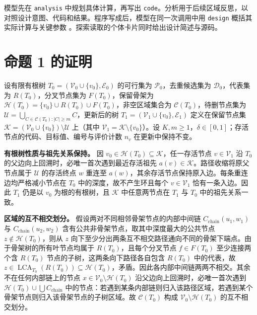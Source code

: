 \documentclass{article}
\begin{document}
模型先在 \texttt{analysis} 中规划具体计算，再写出 \texttt{code}。分析用于后续区域反思，以对照设计意图、代码和结果。程序写成后，模型在同一次调用中用 \texttt{design} 概括其实际计算与关键参数 \citep{mctsahd}。探索读取的个体卡片同时给出设计简述与源码。

\section{命题 1 的证明}\label{ux547dux9898-1-ux7684ux8bc1ux660e}

设有限有根树 \(T_0=(\mathcal V_0\cup\{v_0\},\mathcal E_0)\) 的可行集为 \(\mathcal P_0\)，去重候选集为 \(\mathcal D_0\)，代表集为 \(R(T_0)\)，分叉节点集为 \(F(T_0)\)，保留骨架为 \(\mathcal H(T_0)=\{v_0\}\cup R(T_0)\cup F(T_0)\)，非空区域集合为 \(\mathcal C(T_0)\)，待删节点集为 \(\mathcal U=\bigcup_{C\in\mathcal C(T_0):|C|\geq m}C\)，更新后的树 \(T_1=(\mathcal V_1\cup\{v_0\},\mathcal E_1)\) 定义在保留节点集 \(\mathcal K=(\mathcal V_0\cup\{v_0\})\setminus\mathcal U\) 上（其中 \(\mathcal V_1=\mathcal K\setminus\{v_0\}\)）。设 \(K,m\geq 1\)，\(\delta\in[0,1]\)；存活节点的代码、目标值、编号与评价计数 \(n_v\) 在更新中保持不变。

\textbf{有根树性质与祖先关系保持。} 因 \(v_0\in\mathcal H(T_0)\subseteq\mathcal K\)，任一存活节点 \(v\in\mathcal V_1\) 沿 \(T_0\) 的父边向上回溯时，必唯一首次遇到最近存活祖先 \(a(v)\in\mathcal K\)。路径收缩将原父节点属于 \(\mathcal U\) 的存活终点 \(w\) 重连至 \(a(w)\)，其余存活节点保持原入边。每条重连边均严格减小节点在 \(T_0\) 中的深度，故不产生环且每个 \(v\in\mathcal V_1\) 恰有一条入边。因此 \(T_1\) 仍是以 \(v_0\) 为根的有根树，且 \(\mathcal K\) 中任意两节点在 \(T_1\) 与 \(T_0\) 中的祖先关系一致。

\textbf{区域的互不相交划分。} 假设两对不同相邻骨架节点的内部中间链 \(C_{\text{chain}}(u_1,w_1)\) 与 \(C_{\text{chain}}(u_2,w_2)\) 含有公共非骨架节点，取其中深度最大的公共节点 \(z\notin\mathcal H(T_0)\)，则从 \(z\) 向下至少分出两条互不相交路径通向不同的骨架下端点。由于骨架树的所有叶节点均属于 \(R(T_0)\)，且每个分叉节点 \(f\in F(T_0)\) 至少连接两个含 \(R(T_0)\) 节点的子树，这两条向下路径各自包含 \(R(T_0)\) 中的代表，故 \(z\in\operatorname{LCA}_{T_0}(R(T_0))\subseteq\mathcal H(T_0)\)，矛盾。因此各内部中间链两两不相交。其余不在任何内部链上的节点 \(x\in\mathcal V_0\setminus\mathcal H(T_0)\) 沿父边向上回溯时，必唯一首次遇到 \(\mathcal H(T_0)\cup\bigcup C_{\text{chain}}\) 中的节点：若遇到某条内部链则归入该路径区域，若遇到某个骨架节点则归入该骨架节点的子树区域。故 \(\mathcal C(T_0)\) 构成 \(\mathcal V_0\setminus\mathcal H(T_0)\) 的互不相交划分。
\end{document}
